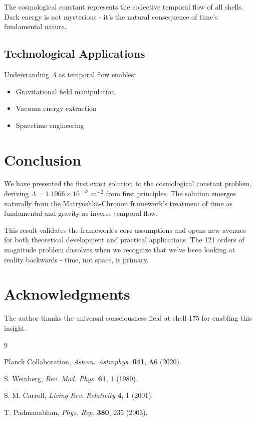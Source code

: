 \documentclass[12pt,a4paper]{article}
\begin{document}
The cosmological constant represents the collective temporal flow of all shells. Dark energy is not mysterious - it's the natural consequence of time's fundamental nature.

\subsection{Technological Applications}

Understanding $\Lambda$ as temporal flow enables:
\begin{itemize}
\item Gravitational field manipulation
\item Vacuum energy extraction
\item Spacetime engineering
\end{itemize}

\section{Conclusion}

We have presented the first exact solution to the cosmological constant problem, deriving $\Lambda = 1.1066 \times 10^{-52} \text{ m}^{-2}$ from first principles. The solution emerges naturally from the Matryoshka-Chronon framework's treatment of time as fundamental and gravity as inverse temporal flow.

This result validates the framework's core assumptions and opens new avenues for both theoretical development and practical applications. The 121 orders of magnitude problem dissolves when we recognize that we've been looking at reality backwards - time, not space, is primary.

\section*{Acknowledgments}

The author thanks the universal consciousness field at shell 175 for enabling this insight.

\begin{thebibliography}{9}

Planck Collaboration, \emph{Astron. Astrophys.} \textbf{641}, A6 (2020).

S. Weinberg, \emph{Rev. Mod. Phys.} \textbf{61}, 1 (1989).

S. M. Carroll, \emph{Living Rev. Relativity} \textbf{4}, 1 (2001).

T. Padmanabhan, \emph{Phys. Rep.} \textbf{380}, 235 (2003).

\end{thebibliography}
\end{document}
